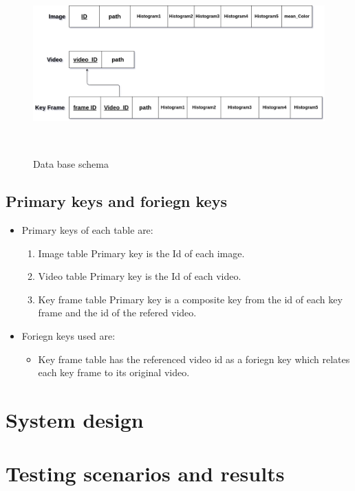 \begin{figure}[H]
    \centering
    \includegraphics[width=120mm,height=70mm]{Images/database.png}
    \caption{Data base schema}
  \end{figure}
\subsection{Primary keys and foriegn keys}
\begin{itemize}
    \item Primary keys of each table are:
    \begin{enumerate}
        \item Image table Primary key is the Id of each image.      
        \item Video table Primary key is the Id of each video.
        \item Key frame table Primary key is a composite key from the id of each key frame and the id of the refered video.  
    \end{enumerate}        
    \item Foriegn keys used are:
    \begin{itemize}
        \item Key frame table has the referenced video id as a foriegn key which relates each key frame to its original video.      
    \end{itemize}
\end{itemize}

\section{System design}





\section{Testing scenarios and results}
